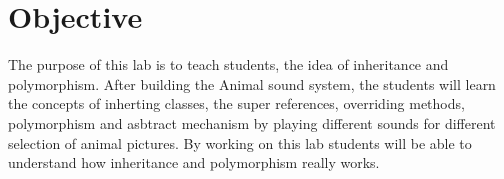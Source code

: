 \section{Objective}

The purpose of this lab is to teach students, the idea of inheritance and polymorphism. After building the Animal sound system, the students will learn the concepts of inherting classes, the super references, overriding methods, polymorphism and asbtract mechanism by playing different sounds for different selection of animal pictures. By working on this lab students will be able to understand how inheritance and polymorphism really works.
